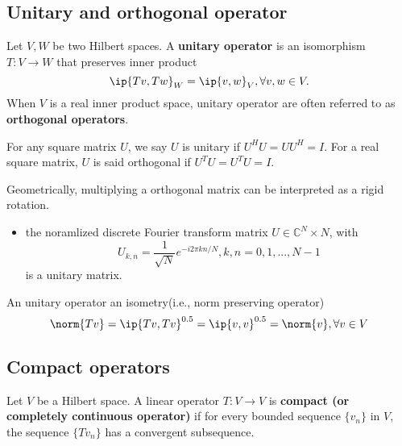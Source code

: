 \begin{refsection}
\subsection{Unitary and orthogonal operator}
\begin{definition}
Let $V,W$ be two Hilbert spaces. A \textbf{unitary operator} is an isomorphism $T:V\rightarrow W$ that preserves inner product 
$$\ip{Tv,Tw}_W = \ip{v,w}_V,\forall v,w\in V.$$
When $V$ is a real inner product space, unitary operator are often referred to as \textbf{orthogonal operators}.
\end{definition}

\begin{definition}
For any square matrix $U$, we say $U$ is unitary if $U^HU=UU^H=I$. For a real square matrix, $U$ is said orthogonal if $U^TU=U^TU=I$.
\end{definition}

\begin{remark}
Geometrically, multiplying a orthogonal matrix can be interpreted as a rigid rotation.
\end{remark}

\begin{example}\hfill
\begin{itemize}
    \item the noramlized discrete Fourier transform matrix $U \in \mathbb{C}^N\times N$, with 
    $$U_{k,n}=\frac{1}{\sqrt{N}}e^{-i2\pi k n/N},k,n=0,1,...,N-1$$
    is a unitary matrix.
\end{itemize}
\end{example}


\begin{lemma}
An unitary operator an isometry(i.e., norm preserving operator)
$$\norm{Tv}=\ip{Tv,Tv}^{0.5}=\ip{v,v}^{0.5}=\norm{v},\forall v\in V$$
\end{lemma}




\subsection{Compact operators}
\begin{definition}\cite[173]{debnath2005hilbert}\cite[98]{krim2015geometric} Let $V$ be a Hilbert space. A linear operator $T:V\to V$ is \textbf{compact (or completely continuous operator)} if for every bounded sequence $\{v_n\}$ in $V$, the sequence $\{Tv_n\}$ has a convergent subsequence. 
\end{definition}




\end{refsection}
